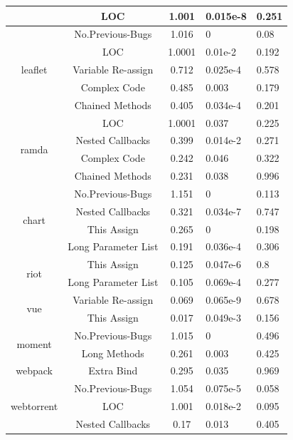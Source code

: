 \begin{table}[!htbp]
\begin{tabular}{c|c|c|p{2cm}|p{2cm}}
		& LOC & 1.001 & 0.015e-8 & 0.251 \\ \hline
		\multirow{5}{*}{leaflet}
		& No.Previous-Bugs & 1.016 & 0 & 0.08 \\ \cline{2-5}
		& LOC & 1.0001 & 0.01e-2 & 0.192 \\ \cline{2-5}
		& Variable Re-assign & 0.712 & 0.025e-4 & 0.578 \\ \cline{2-5}
		& Complex Code & 0.485 & 0.003 & 0.179 \\ \cline{2-5}
		& Chained Methods & 0.405 & 0.034e-4 & 0.201 \\ \hline
		\multirow{4}{*}{ramda}
		& LOC & 1.0001 & 0.037 & 0.225 \\ \cline{2-5}
		& Nested Callbacks & 0.399 & 0.014e-2 & 0.271 \\ \cline{2-5}
		& Complex Code & 0.242 & 0.046 & 0.322 \\ \cline{2-5}
		& Chained Methods & 0.231 & 0.038 & 0.996 \\ \hline
		\multirow{4}{*}{chart}
		& No.Previous-Bugs & 1.151 & 0 & 0.113 \\ \cline{2-5}
		& Nested Callbacks & 0.321 & 0.034e-7 & 0.747 \\ \cline{2-5}
		& This Assign & 0.265 & 0 & 0.198 \\ \cline{2-5}
		& Long Parameter List & 0.191 & 0.036e-4 & 0.306 \\ \hline
		\multirow{2}{*}{riot}
		& This Assign & 0.125 & 0.047e-6 & 0.8 \\ \cline{2-5}
		& Long Parameter List & 0.105 & 0.069e-4 & 0.277 \\ \hline
		\multirow{2}{*}{vue}
		& Variable Re-assign & 0.069 & 0.065e-9 & 0.678 \\ \cline{2-5}
		& This Assign & 0.017 & 0.049e-3 & 0.156 \\ \hline
		\multirow{2}{*}{moment}
		& No.Previous-Bugs & 1.015 & 0 & 0.496 \\ \cline{2-5}
		& Long Methods & 0.261 & 0.003 & 0.425 \\ \hline
		\multirow{1}{*}{webpack}
		& Extra Bind & 0.295 & 0.035 & 0.969 \\ \hline
		\multirow{3}{*}{webtorrent}
		& No.Previous-Bugs & 1.054 & 0.075e-5 & 0.058 \\ \cline{2-5}
		& LOC & 1.001 & 0.018e-2 & 0.095 \\ \cline{2-5}
		& Nested Callbacks & 0.17 & 0.013 & 0.405 \\ \hline
	\end{tabular}
	\label{smelltypes2}
	\vspace{-15pt}
\end{table}


